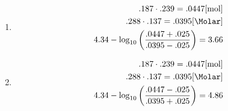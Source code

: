\documentclass[12pt]{article}
\begin{document}
\begin{enumerate}
\begin{enumerate}
      \item {}

        \begin{equation}
          \begin{split}
            .187\cdot.239=.0447[\si{\mole}]\\
          .288\cdot.137=.0395[\si{\Molar}]\\
          4.34-\log_{10}\left( \frac{.0447+.025}{.0395-.025} \right)=3.66
          \end{split}
          \label{3}
        \end{equation}

      \item

        \begin{equation}
          \begin{split}
            .187\cdot.239=.0447[\si{\mole}]\\
          .288\cdot.137=.0395[\si{\Molar}]\\
          4.34-\log_{10}\left( \frac{.0447-.025}{.0395+.025} \right)=4.86
          \end{split}
          \label{3}
        \end{equation}

    \end{enumerate}

\end{enumerate}
\end{document}
